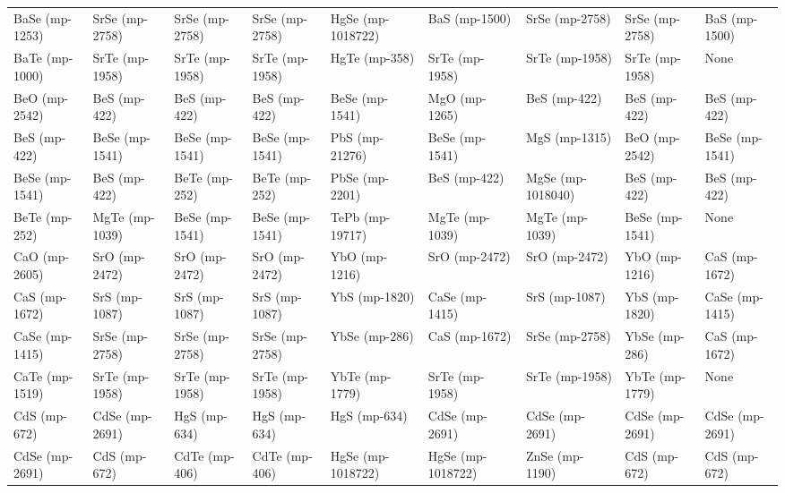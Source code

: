 \begin{longtable}{lllllllll}
   BaSe (mp-1253) &    SrSe (mp-2758) &      SrSe (mp-2758) &    SrSe (mp-2758) &   HgSe (mp-1018722) &     BaS (mp-1500) &    SrSe (mp-2758) &    SrSe (mp-2758) &     BaS (mp-1500) \\
   BaTe (mp-1000) &    SrTe (mp-1958) &      SrTe (mp-1958) &    SrTe (mp-1958) &       HgTe (mp-358) &    SrTe (mp-1958) &    SrTe (mp-1958) &    SrTe (mp-1958) &              None \\
    BeO (mp-2542) &      BeS (mp-422) &        BeS (mp-422) &      BeS (mp-422) &      BeSe (mp-1541) &     MgO (mp-1265) &      BeS (mp-422) &      BeS (mp-422) &      BeS (mp-422) \\
     BeS (mp-422) &    BeSe (mp-1541) &      BeSe (mp-1541) &    BeSe (mp-1541) &      PbS (mp-21276) &    BeSe (mp-1541) &     MgS (mp-1315) &     BeO (mp-2542) &    BeSe (mp-1541) \\
   BeSe (mp-1541) &      BeS (mp-422) &       BeTe (mp-252) &     BeTe (mp-252) &      PbSe (mp-2201) &      BeS (mp-422) & MgSe (mp-1018040) &      BeS (mp-422) &      BeS (mp-422) \\
    BeTe (mp-252) &    MgTe (mp-1039) &      BeSe (mp-1541) &    BeSe (mp-1541) &     TePb (mp-19717) &    MgTe (mp-1039) &    MgTe (mp-1039) &    BeSe (mp-1541) &              None \\
    CaO (mp-2605) &     SrO (mp-2472) &       SrO (mp-2472) &     SrO (mp-2472) &       YbO (mp-1216) &     SrO (mp-2472) &     SrO (mp-2472) &     YbO (mp-1216) &     CaS (mp-1672) \\
    CaS (mp-1672) &     SrS (mp-1087) &       SrS (mp-1087) &     SrS (mp-1087) &       YbS (mp-1820) &    CaSe (mp-1415) &     SrS (mp-1087) &     YbS (mp-1820) &    CaSe (mp-1415) \\
   CaSe (mp-1415) &    SrSe (mp-2758) &      SrSe (mp-2758) &    SrSe (mp-2758) &       YbSe (mp-286) &     CaS (mp-1672) &    SrSe (mp-2758) &     YbSe (mp-286) &     CaS (mp-1672) \\
   CaTe (mp-1519) &    SrTe (mp-1958) &      SrTe (mp-1958) &    SrTe (mp-1958) &      YbTe (mp-1779) &    SrTe (mp-1958) &    SrTe (mp-1958) &    YbTe (mp-1779) &              None \\
     CdS (mp-672) &    CdSe (mp-2691) &        HgS (mp-634) &      HgS (mp-634) &        HgS (mp-634) &    CdSe (mp-2691) &    CdSe (mp-2691) &    CdSe (mp-2691) &    CdSe (mp-2691) \\
   CdSe (mp-2691) &      CdS (mp-672) &       CdTe (mp-406) &     CdTe (mp-406) &   HgSe (mp-1018722) & HgSe (mp-1018722) &    ZnSe (mp-1190) &      CdS (mp-672) &      CdS (mp-672) \\

\end{longtable}
